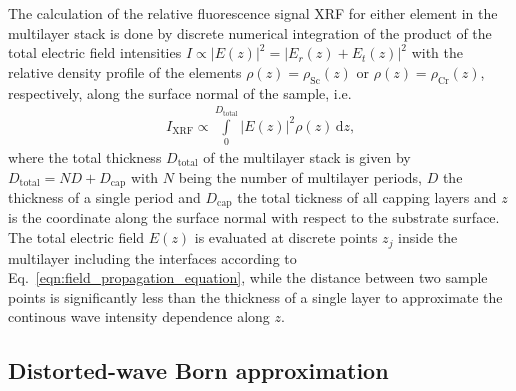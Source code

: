 \documentclass{iucr}              %
\begin{document}
The calculation of the relative fluorescence signal XRF for either element in the multilayer stack is done by discrete numerical integration of the product of the total electric field intensities $I \propto |E(z)|^2 = | E_r(z) + E_t(z)|^2$ with the relative density profile of the elements $\rho(z) = \rho_\text{Sc}(z)$ or $\rho(z) = \rho_\text{Cr}(z)$, respectively, along the surface normal of the sample, i.e.~
\begin{align}
 I_\text{XRF}\propto \int\limits_0^{D_\text{total}} |E(z)|^2 \rho(z) \,\text{d}z \text{,}
\end{align}
where the total thickness $D_\text{total}$ of the multilayer stack is given by $D_\text{total} = N D+D_\text{cap}$ with $N$ being the number of multilayer periods, $D$ the thickness of a single period and $D_\text{cap}$ the total tickness of all capping layers and $z$ is the coordinate along the surface normal with respect to the substrate surface. The total electric field $E(z)$ is evaluated at discrete points $z_j$ inside the multilayer including the interfaces according to Eq.~\eqref{eqn:field_propagation_equation}, while the distance between two sample points is significantly less than the thickness of a single layer to approximate the continous wave intensity dependence along $z$.
\subsection{Distorted-wave Born approximation} \label{subsec:dwba_formalism}
\end{document}
